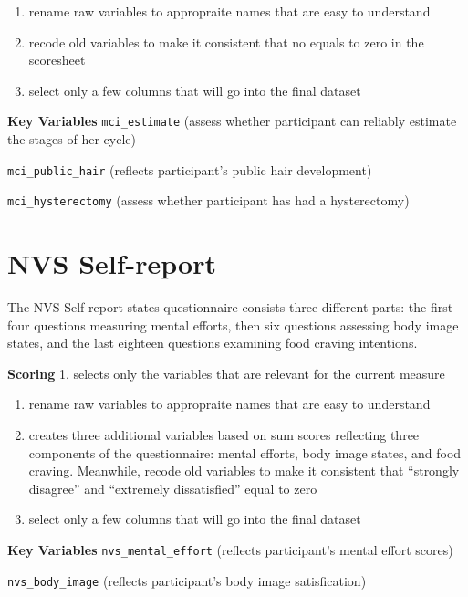 \documentclass[
]{book}
\begin{document}
\begin{enumerate}
\def\labelenumi{\arabic{enumi}.}
\setcounter{enumi}{1}
\item
  rename raw variables to appropraite names that are easy to understand
\item
  recode old variables to make it consistent that no equals to zero in the scoresheet
\item
  select only a few columns that will go into the final dataset
\end{enumerate}

\textbf{Key Variables}
\texttt{mci\_estimate} (assess whether participant can reliably estimate the stages of her cycle)

\texttt{mci\_public\_hair} (reflects participant's public hair development)

\texttt{mci\_hysterectomy} (assess whether participant has had a hysterectomy)

\hypertarget{nvs-self-report}{%
\section{NVS Self-report}\label{nvs-self-report}}

The NVS Self-report states questionnaire consists three different parts: the first four questions measuring mental efforts, then six questions assessing body image states, and the last eighteen questions examining food craving intentions.

\textbf{Scoring}
1. selects only the variables that are relevant for the current measure

\begin{enumerate}
\def\labelenumi{\arabic{enumi}.}
\setcounter{enumi}{1}
\item
  rename raw variables to appropraite names that are easy to understand
\item
  creates three additional variables based on sum scores reflecting three components of the questionnaire: mental efforts, body image states, and food craving. Meanwhile, recode old variables to make it consistent that ``strongly disagree'' and ``extremely dissatisfied'' equal to zero
\item
  select only a few columns that will go into the final dataset
\end{enumerate}

\textbf{Key Variables}
\texttt{nvs\_mental\_effort} (reflects participant's mental effort scores)

\texttt{nvs\_body\_image} (reflects participant's body image satisfication)
\end{document}
